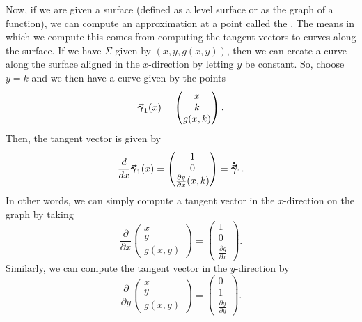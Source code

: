                                         Now, if we are given a surface (defined as a level surface or as the graph of a function), we can compute an approximation at a point called the . The means in which we compute this comes from computing the tangent vectors to curves along the surface.  If we have $\Sigma$ given by $(x,y,g(x,y))$, then we can create a curve along the surface aligned in the $x$-direction by letting $y$ be constant.  So, choose $y=k$ and we then have a curve given by the points
                                        \[
                                        \boldsymbol{\vec{\gamma}}_1(x) = \begin{pmatrix} x \\ k \\ g(x,k) \end{pmatrix}.
                                        \]
                                        Then, the tangent vector is given by
                                        \[
                                        \frac{d}{dx} \boldsymbol{\vec{\gamma}}_1(x) = \begin{pmatrix} 1 \\ 0 \\ \frac{\partial g}{\partial x} (x,k) \end{pmatrix} = \boldsymbol{\dot{\vec{\gamma}}}_1.
                                        \]
                                        In other words, we can simply compute a tangent vector in the $x$-direction on the graph by taking
                                        \[
                                        \frac{\partial}{\partial x} \begin{pmatrix} x \\ y \\ g(x,y) \end{pmatrix} = \begin{pmatrix} 1 \\ 0 \\ \frac{\partial g}{\partial x} \end{pmatrix}.
                                        \]
                                        Similarly, we can compute the tangent vector in the $y$-direction by
                                        \[
                                        \frac{\partial}{\partial y} \begin{pmatrix} x \\ y \\ g(x,y) \end{pmatrix} = \begin{pmatrix} 0 \\ 1 \\ \frac{\partial g}{\partial y} \end{pmatrix}.
                                        \]
